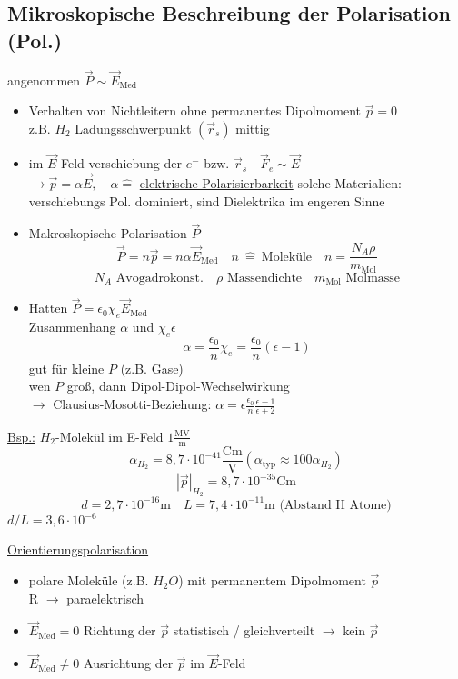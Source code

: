 \documentclass[titlepage,12pt,a4paper,ngerman]{report}
\newcommand{\tx}[1]{\textrm{#1}}
\begin{document}
\subsection{Mikroskopische Beschreibung der Polarisation (Pol.)}
angenommen $\vec{P} \sim \vec{E}_{\tx{Med}}$
\begin{itemize}
\item Verhalten von Nichtleitern ohne permanentes Dipolmoment $\vec{p} = 0$\\
z.B. $H_2$ Ladungsschwerpunkt $(\vec{r}_s)$ mittig 
\item im $\vec{E}$-Feld verschiebung der $e^-$ bzw. $\vec{r}_s \quad \vec{F}_e \sim \vec{E}$\\
$\rightarrow \vec{p} = \alpha \vec{E},\quad  \alpha \widehat{=}$ \underline{elektrische Polarisierbarkeit} solche Materialien: verschiebungs Pol. dominiert, sind Dielektrika im engeren Sinne
\item Makroskopische Polarisation $\vec{P}$
$$\vec{P} = n \vec{p}  = n \alpha \vec{E}_{\tx{Med}} \quad n \ \widehat{ = }\  \tx{Moleküle} \quad  n = \frac{N_A \rho}{m_{\tx{Mol}}}$$
$$ N_A \tx{ Avogadrokonst.} \quad \rho \tx{ Massendichte} \quad m_{\tx{Mol}} \tx{ Molmasse}$$
\item Hatten $ \vec{P} = \epsilon_0 \chi_e \vec{E}_{\tx{Med}}$\\
Zusammenhang $\alpha$ und $\chi_e \epsilon$
$$\boxed{ \alpha = \frac{\epsilon_0}{n} \chi_e = \frac{\epsilon_0}{n} (\epsilon-1)
}$$
gut für kleine $P$ (z.B. Gase)\\
wen $P$ groß, dann Dipol-Dipol-Wechselwirkung\\
$\rightarrow$ Clausius-Mosotti-Beziehung: $\alpha = \epsilon \frac{\epsilon_0}{n} \frac{\epsilon-1}{\epsilon+2}$
\end{itemize}
\underline{Bsp.:} $H_2$-Molekül im E-Feld $1\frac{\tx{MV}}{\tx{m}}$
$$\alpha_{H_2} = 8,7 \cdot 10^{-41} \frac{\tx{Cm}}{\tx{V}} (\alpha_{\tx{typ}} \approx 100 \alpha_{H_2})$$
$$|\vec{p}|_{H_2} = 8,7 \cdot 10^{-35} \tx{Cm}$$
$$d = 2,7\cdot 10^{-16} \tx{m} \quad L = 7,4 \cdot 10^{-11}\tx{m} \tx{ (Abstand H Atome)}$$
$d/L = 3,6\cdot 10^{-6}$

\underline{Orientierungspolarisation}
\begin{itemize}
\item polare Moleküle (z.B. $H_2O$) mit permanentem Dipolmoment $\vec{p}$\\R
$\rightarrow $ paraelektrisch
\item$\vec{E}_{\tx{Med}} = 0 $ Richtung der $ \vec{p}$ statistisch / gleichverteilt $\rightarrow$ kein $\vec{p}$
\item $\vec{E}_{\tx{Med}} \neq 0$ Ausrichtung der $\vec{p}$ im $\vec{E}$-Feld
\end{itemize}
\end{document}
